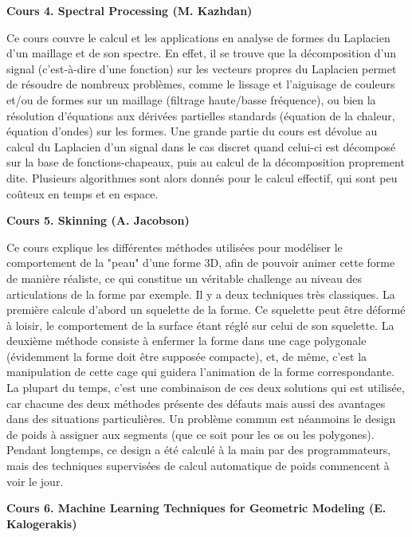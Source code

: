 \documentclass[a4paper, 11pt]{article}
\begin{document}
\begin{center} \textbf{Cours 4. Spectral Processing (M. Kazhdan)} \end{center}

Ce cours couvre le calcul et les applications en analyse de formes du Laplacien d'un maillage et de son spectre.
En effet, il se trouve que la d\'ecomposition d'un signal (c'est-\`a-dire d'une fonction) sur les vecteurs propres du Laplacien
permet de r\'esoudre de nombreux probl\`emes, comme le lissage et l'aiguisage de couleurs et/ou de formes sur un maillage (filtrage haute/basse fr\'equence), ou
bien la r\'esolution d'\'equations aux d\'eriv\'ees partielles standards (\'equation de la chaleur, \'equation d'ondes) sur les formes.
Une grande partie du cours est d\'evolue au calcul du Laplacien d'un signal dans le cas discret quand celui-ci est d\'ecompos\'e sur la
base de fonctions-chapeaux, puis au calcul de la d\'ecomposition proprement dite. Plusieurs algorithmes sont alors donn\'es pour le calcul effectif, 
qui sont peu co\^uteux en temps et en espace.   

\begin{center} \textbf{Cours 5. Skinning (A. Jacobson)} \end{center}

Ce cours explique les diff\'erentes m\'ethodes utilis\'ees pour mod\'eliser le comportement de la "peau" d'une forme 3D, afin
de pouvoir animer cette forme de mani\`ere r\'ealiste, ce qui constitue un v\'eritable challenge au niveau des articulations de la forme par exemple.
Il y a deux techniques tr\`es classiques. La premi\`ere calcule d'abord un squelette de la forme. Ce squelette peut \^etre d\'eform\'e \`a loisir,
le comportement de la surface \'etant r\'egl\'e sur celui de son squelette. La deuxi\`eme m\'ethode consiste \`a enfermer la forme dans une cage
polygonale (\'evidemment la forme doit \^etre suppos\'ee compacte), et, de m\^eme, c'est la manipulation de cette cage qui guidera l'animation de 
la forme correspondante. La plupart du temps, c'est une combinaison de ces deux solutions qui est utilis\'ee, car chacune des deux m\'ethodes
pr\'esente des d\'efauts mais aussi des avantages dans des situations particuli\`eres. Un probl\`eme commun est n\'eanmoins le design de poids
\`a assigner aux segments (que ce soit pour les os ou les polygones). Pendant longtemps, ce design a \'et\'e calcul\'e \`a la main par des programmateurs,
mais des techniques supervis\'ees de calcul automatique de poids commencent \`a voir le jour.

\begin{center} \textbf{Cours 6. Machine Learning Techniques for Geometric Modeling (E. Kalogerakis)} \end{center}
\end{document}
